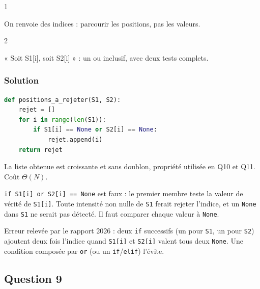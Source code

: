 \documentclass[11pt,a4paper]{article}
\begin{document}
\begin{indication}{1}

On renvoie des indices : parcourir les positions, pas les valeurs.

\end{indication}

\begin{indication}{2}

« Soit S1{[}i{]}, soit S2{[}i{]} » : un ou inclusif, avec deux tests complets.

\end{indication}

\hypertarget{solution-7}{%
\subsubsection{Solution}\label{solution-7}}

\begin{lstlisting}[language=Python]
def positions_a_rejeter(S1, S2):
    rejet = []
    for i in range(len(S1)):
        if S1[i] == None or S2[i] == None:
            rejet.append(i)
    return rejet
\end{lstlisting}

La liste obtenue est croissante et sans doublon, propriété utilisée en Q10 et Q11. Coût \(\Theta(N)\).

\begin{piege}

\texttt{if\ S1{[}i{]}\allowbreak{}\ or\ S2{[}i{]}\allowbreak{}\ =\allowbreak{}=\allowbreak{}\ None} est faux : le premier membre teste la valeur de vérité de \texttt{S1{[}i{]}}. Toute intensité non nulle de \texttt{S1} ferait rejeter l'indice, et un \texttt{None} dans \texttt{S1} ne serait pas détecté. Il faut comparer chaque valeur à \texttt{None}.

\end{piege}

\begin{piege}

Erreur relevée par le rapport 2026 : deux \texttt{if} successifs (un pour \texttt{S1}, un pour \texttt{S2}) ajoutent deux fois l'indice quand \texttt{S1{[}i{]}} et \texttt{S2{[}i{]}} valent tous deux \texttt{None}. Une condition composée par \texttt{or} (ou un \texttt{if}/\texttt{elif}) l'évite.

\end{piege}

\hypertarget{question-9}{%
\subsection{Question 9}\label{question-9}}
\end{document}
